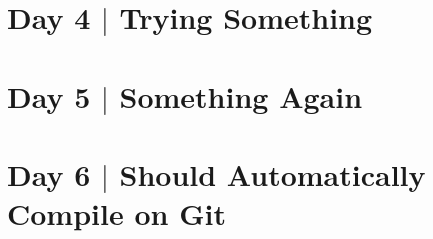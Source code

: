 \documentclass[10pt]{article}
\begin{document}
\newpage
\section{Day 4 $\mid$ Trying Something}

\newpage
\section{Day 5 $\mid$ Something Again}


\newpage
\section{Day 6 $\mid$ Should Automatically Compile on Git}
\end{document}

